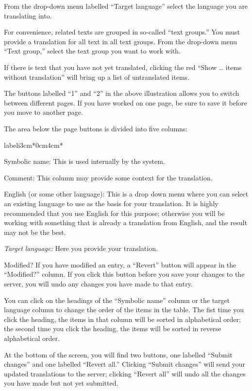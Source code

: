 \documentclass[11pt,oneside,a4paper]{memoir}
\begin{document}
From the drop-down menu labelled ``Target language'' select the language you are translating into.

For convenience, related texts are grouped in so-called ``text groups.'' You must provide a
translation for all text in all text groups. From the drop-down menu ``Text group,'' select the text
group you want to work with.

If there is text that you have not yet translated, clicking the red ``Show \ldots{} items without
translation'' will bring up a list of untranslated items.

The buttons labelled ``1'' and ``2'' in the above illustration allows you to switch between different
pages. If you have worked on one page, be sure to save it before you move to another page.

The area below the page buttons is divided into five columns:


\newcommand*{\labeli}[1]{\normalfont\bfseries #1}

\begin{flexlabelled}{labeli}{3cm}{*}{0cm}{4cm}{*}
\item[Symbolic name:\hfill] This is used internally by the system.
\item[Comment:] This column may provide some context for the translation.
\item[English (or some other language):] This is a drop down menu where you can select an existing
  language to use as the basis for your translation. It is highly recommended that you use English
  for this purpose; otherwise you will be working with something that is already a translation
  from English, and the result may not be the best.
\item[\emph{Target language:}\hfill]  Here you provide your translation.
\item[Modified?] If you have modified an entry, a ``Revert'' button will appear in the ``Modified?''
  column. If you click this button before you save your changes to the server, you will undo any
  changes you have made to that entry.
\end{flexlabelled}

You can click on the headings of the ``Symbolic name'' column or the target language column to change
the order of the items in the table. The fist time you click the heading, the items in that column
will be sorted in alphabetical order; the second time you click the heading, the items will be sorted
in reverse alphabetical order.

At the bottom of the screen, you will find two buttons, one labelled ``Submit changes'' and one
labelled ``Revert all.'' Clicking ``Submit changes'' will send your updated translations to the server;
clicking ``Revert all'' will undo all the changes you have made but not yet submitted.
\end{document}
